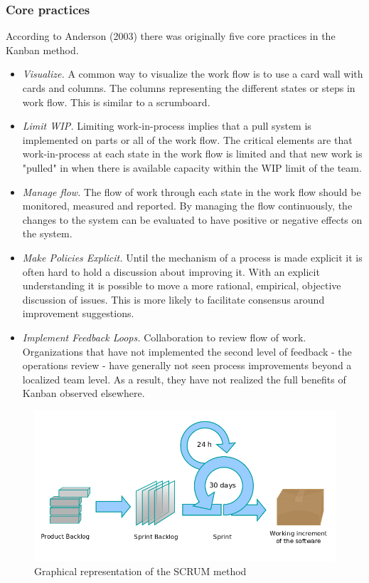 \subsubsection{Core practices}
According to Anderson (2003\cite{Kanban}) there was originally five core practices in the Kanban method. 
\begin{itemize}
	\item \emph{Visualize.} A common way to visualize the work flow is to use a card wall with cards and columns. The columns representing the different states or steps in work flow. This is similar to a scrumboard.
	\item \emph{Limit WIP.} Limiting work-in-process implies that a pull system is implemented on parts or all of the work flow. The critical elements are that work-in-process at each state in the work flow is limited and that new work is "pulled" in when there is available capacity within the WIP limit of the team.
	\item \emph{Manage flow.} The flow of work through each state in the work flow should be monitored, measured and reported. By managing the flow continuously, the changes to the system can be evaluated to have positive or negative effects on the system.
	\item \emph{Make Policies Explicit.} Until the mechanism of a process is made explicit it is often hard to hold  a discussion about improving it. With an explicit understanding it is possible to move a more rational, empirical, objective discussion of issues. This is more likely to facilitate consensus around improvement suggestions. 
	\item \emph{Implement Feedback Loops.} Collaboration to review flow of work. Organizations that have not implemented the second level of feedback - the operations review - have generally not seen process improvements beyond a localized team level. As a result, they have not realized the full benefits of Kanban observed elsewhere.
\end{itemize}

\begin{figure}
	\begin{center}
		\includegraphics[width=14cm]{Pictures/Scrum_model}
	\end{center}
	\caption{Graphical representation of the SCRUM method\cite{scrummodel}}
	\label{fig:scrum}
\end{figure}

